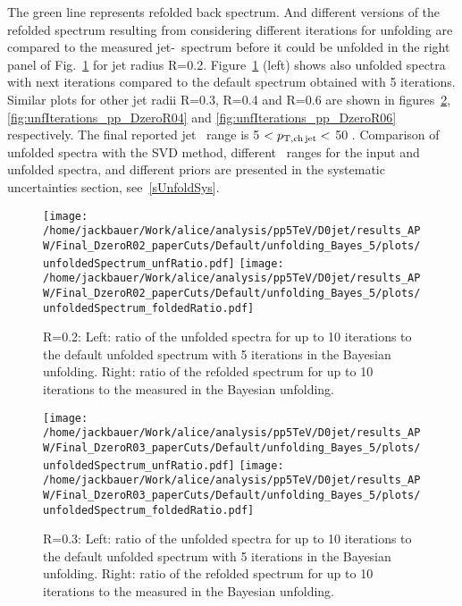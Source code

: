 The green line represents refolded back spectrum. And different versions of the refolded spectrum resulting from considering different iterations for unfolding are compared to the measured jet-\pt\ spectrum before it could be unfolded in the right panel of Fig.~\ref{fig:unfIterations_pp_DzeroR02} for jet radius R=0.2. Figure~\ref{fig:unfIterations_pp_DzeroR02} (left) shows also unfolded spectra with next iterations compared to the default spectrum obtained with 5 iterations. Similar plots for other jet radii R=0.3, R=0.4 and R=0.6 are shown in figures~\ref{fig:unfIterations_pp_DzeroR03}, \ref{fig:unfIterations_pp_DzeroR04} and \ref{fig:unfIterations_pp_DzeroR06} respectively. The final reported jet \pt\ range is 5 $< p_{\mathrm{T,ch\, jet}}<$ 50 \GeVc.
Comparison of unfolded spectra with the SVD method, different \pt\ ranges for the input and unfolded spectra, and different priors are presented in the systematic uncertainties section, see~\ref{sUnfoldSys}. 

\begin{figure}[bth]
\centering
\texttt{[image: /home/jackbauer/Work/alice/analysis/pp5TeV/D0jet/results\_APW/Final\_DzeroR02\_paperCuts/Default/unfolding\_Bayes\_5/plots/unfoldedSpectrum\_unfRatio.pdf]}
\texttt{[image: /home/jackbauer/Work/alice/analysis/pp5TeV/D0jet/results\_APW/Final\_DzeroR02\_paperCuts/Default/unfolding\_Bayes\_5/plots/unfoldedSpectrum\_foldedRatio.pdf]}
\caption{R=0.2: Left: ratio of the unfolded spectra for up to 10 iterations to the default unfolded spectrum with 5 iterations in the Bayesian unfolding. Right: ratio of the refolded spectrum for up to 10 iterations to the measured in the Bayesian unfolding. 
}
\label{fig:unfIterations_pp_DzeroR02}
\end{figure}

\begin{figure}[bth]
\centering
\texttt{[image: /home/jackbauer/Work/alice/analysis/pp5TeV/D0jet/results\_APW/Final\_DzeroR03\_paperCuts/Default/unfolding\_Bayes\_5/plots/unfoldedSpectrum\_unfRatio.pdf]}
\texttt{[image: /home/jackbauer/Work/alice/analysis/pp5TeV/D0jet/results\_APW/Final\_DzeroR03\_paperCuts/Default/unfolding\_Bayes\_5/plots/unfoldedSpectrum\_foldedRatio.pdf]}
\caption{R=0.3: Left: ratio of the unfolded spectra for up to 10 iterations to the default unfolded spectrum with 5 iterations in the Bayesian unfolding. Right: ratio of the refolded spectrum for up to 10 iterations to the measured in the Bayesian unfolding. 
}
\label{fig:unfIterations_pp_DzeroR03}
\end{figure}

